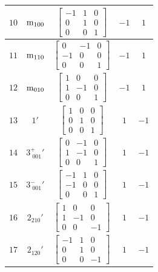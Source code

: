 \documentclass[fleqn,8pt]{jsarticle}
\begin{document}
\begin{longtable}{ccccc}
$ 10 $ & $ {\rm m}_{100} $ & $ \begin{bmatrix} -1 & 1 & 0 \\ 0 & 1 & 0 \\ 0 & 0 & 1 \end{bmatrix} $ & $ -1 $ & $ 1 $ \\ \hline
$ 11 $ & $ {\rm m}_{110} $ & $ \begin{bmatrix} 0 & -1 & 0 \\ -1 & 0 & 0 \\ 0 & 0 & 1 \end{bmatrix} $ & $ -1 $ & $ 1 $ \\ \hline
$ 12 $ & $ {\rm m}_{010} $ & $ \begin{bmatrix} 1 & 0 & 0 \\ 1 & -1 & 0 \\ 0 & 0 & 1 \end{bmatrix} $ & $ -1 $ & $ 1 $ \\ \hline
$ 13 $ & $ 1{}' $ & $ \begin{bmatrix} 1 & 0 & 0 \\ 0 & 1 & 0 \\ 0 & 0 & 1 \end{bmatrix} $ & $ 1 $ & $ -1 $ \\ \hline
$ 14 $ & $ 3^{+}_{\,\,001}{}' $ & $ \begin{bmatrix} 0 & -1 & 0 \\ 1 & -1 & 0 \\ 0 & 0 & 1 \end{bmatrix} $ & $ 1 $ & $ -1 $ \\ \hline
$ 15 $ & $ 3^{-}_{\,\,001}{}' $ & $ \begin{bmatrix} -1 & 1 & 0 \\ -1 & 0 & 0 \\ 0 & 0 & 1 \end{bmatrix} $ & $ 1 $ & $ -1 $ \\ \hline
$ 16 $ & $ 2{}_{210}{}' $ & $ \begin{bmatrix} 1 & 0 & 0 \\ 1 & -1 & 0 \\ 0 & 0 & -1 \end{bmatrix} $ & $ 1 $ & $ -1 $ \\ \hline
$ 17 $ & $ 2{}_{120}{}' $ & $ \begin{bmatrix} -1 & 1 & 0 \\ 0 & 1 & 0 \\ 0 & 0 & -1 \end{bmatrix} $ & $ 1 $ & $ -1 $ \\ \hline

\end{longtable}
\end{document}
